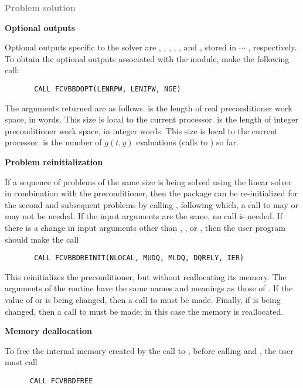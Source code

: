 \begin{Steps}
\item \textcolor{gray}{\bf Problem solution}
  
\item {\bf {\cvbbdpre} Optional outputs}
  
  Optional outputs specific to the {\spgmr} solver are , ,
  , , , and , stored in  $\cdots$
  , respectively.
  To obtain the optional outputs associated with the {\cvbbdpre} module, make
  the following call:
\begin{verbatim}
       CALL FCVBBDOPT(LENRPW, LENIPW, NGE)
\end{verbatim}
  The arguments returned are as follows.
   is the length of real preconditioner work space, in 
  words.  This size is local to the current processor.
   is the length of integer preconditioner work space, in integer
  words.  This size is local to the current processor.
   is the number of $g(t,y)$ evaluations (calls to ) so far.
  
\item {\bf Problem reinitialization}
  
  If a sequence of problems of the same size is being solved using the {\spgmr}
  linear solver in combination with the {\cvbbdpre} preconditioner, then the
  {\cvode} package can be re-initialized for the second and subsequent problems
  by calling , following which, a call to  may or 
  may not be needed.
  If the input arguments are the same, no  call is needed.
  If there is a change in input arguments other than , , or
  , then the user program should make the call 
\begin{verbatim}
       CALL FCVBBDREINIT(NLOCAL, MUDQ, MLDQ, DQRELY, IER)
\end{verbatim}
  This reinitializes the {\cvbbdpre} preconditioner, but without
  reallocating its memory.  The arguments of the 
  routine have the same names and meanings as those of .
  If the value of  or  is being changed, then a call to
   must be made.  Finally, if  is being
  changed, then a call to  must be made; in this case
  the {\spgmr} memory is reallocated.
  
\item {\bf Memory deallocation}

  To free the internal memory created by the call to , before
  calling  and , the user must call
\begin{verbatim}
      CALL FCVBBDFREE
\end{verbatim}

\end{Steps}
